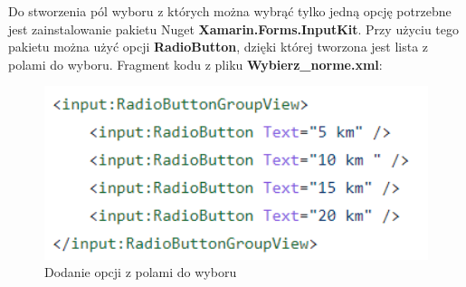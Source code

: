 Do stworzenia pól wyboru z których można wybrąć tylko jedną opcję potrzebne jest zainstalowanie pakietu Nuget \textbf{Xamarin.Forms.InputKit}. Przy użyciu tego pakietu można użyć opcji \textbf{RadioButton}, dzięki której tworzona jest lista z polami do wyboru. \newline \newline
 Fragment kodu z pliku \textbf{Wybierz\_norme.xml}: \newline
 \begin{figure}[!htb]
 	\begin{center}
 		\includegraphics[width=12cm]{rys/checkboxy.png}
 		\caption{Dodanie opcji z polami do wyboru}
 		\label{rys:rysunek010}
 	\end{center}
 \end{figure}
  
  


